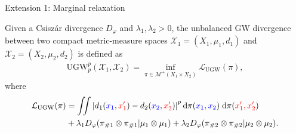 \documentclass{beamer}
\newcommand{\ugw}{\text{UGW}}
\newcommand{\cX}{\mathcal X}
\newcommand{\cM}{\mathcal M}
\newcommand{\cL}{\mathcal L}
\newcommand{\rmd}{\mathrm{d}}
\begin{document}
\begin{frame}{Extension 1: Marginal relaxation}
  \vspace{-0.5cm}
  \scriptsize
  \begin{definition}
    Given a Csiszár divergence $D_{\varphi}$ and $\lambda_1, \lambda_2 > 0$,
    the unbalanced GW divergence between two compact metric-measure spaces
    $\cX_1 = (X_1, \mu_1, d_1)$ and $\cX_2 = (X_2, \mu_2, d_2)$ is defined as
    \begin{align*}
      \ugw_p^p(\cX_1, \cX_2) = \inf_{\pi \in \cM^+(X_1 \times X_2)} \cL_{\ugw}(\pi),
    \end{align*}
    \vspace{-0.3cm}
    where
    \vspace{-0.5cm}
    \begin{align*}
      \cL_{\ugw}(\pi) &= \iint \left| d_1({\color{blue}{x_1}}, {\color{red}{x_1'}}) - d_2({\color{blue}{x_2}}, {\color{red}{x_2'}}) \right|^p
      \rmd\pi({\color{blue}{x_1, x_2}}) \; \rmd\pi({\color{red}{x_1', x_2'}}) \\
      &+ \lambda_1 D_{\varphi}(\pi_{\# 1} \otimes \pi_{\# 1} | \mu_1 \otimes \mu_1)
      + \lambda_2 D_{\varphi}(\pi_{\# 2} \otimes \pi_{\# 2} | \mu_2 \otimes \mu_2).
    \end{align*}
  \end{definition}

  \vspace{-0.5cm}


\end{frame}
\end{document}
